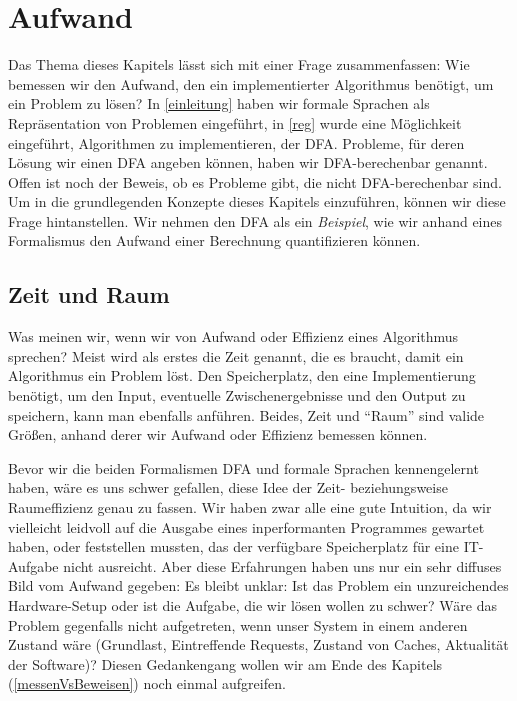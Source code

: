 \chapter{Aufwand}
Das Thema dieses Kapitels lässt sich mit einer Frage zusammenfassen:
Wie bemessen wir den Aufwand,
den ein implementierter Algorithmus benötigt, um ein Problem zu lösen?
In \autoref{einleitung} haben wir formale Sprachen als Repräsentation von Problemen eingeführt,
in \autoref{reg} wurde eine Möglichkeit eingeführt, Algorithmen zu implementieren,
der DFA.
Probleme, für deren Lösung wir einen DFA angeben können, haben wir DFA-berechenbar genannt.
Offen ist noch der Beweis, ob es Probleme gibt, die nicht DFA-berechenbar sind.
Um in die grundlegenden Konzepte dieses Kapitels einzuführen,
können wir diese Frage hintanstellen.
Wir nehmen den DFA als ein \emph{Beispiel},
wie wir anhand eines Formalismus den Aufwand einer Berechnung quantifizieren können.

\section{Zeit und Raum}

Was meinen wir, wenn wir von Aufwand oder Effizienz eines Algorithmus sprechen?
Meist wird als erstes die Zeit genannt,
die es braucht,
damit ein Algorithmus ein Problem löst.
Den Speicherplatz,
den eine Implementierung benötigt,
um den Input,
eventuelle Zwischenergebnisse
und den Output zu speichern,
kann man ebenfalls anführen.
Beides, Zeit und ``Raum'' sind valide Größen,
anhand derer wir Aufwand oder Effizienz bemessen können.

Bevor wir die beiden Formalismen DFA und formale Sprachen kennengelernt haben,
wäre es uns schwer gefallen,
diese Idee der Zeit- beziehungsweise Raumeffizienz genau zu fassen.
Wir haben zwar alle eine gute Intuition,
da wir vielleicht leidvoll auf die Ausgabe eines inperformanten Programmes gewartet haben,
oder feststellen mussten, das der verfügbare Speicherplatz für eine IT-Aufgabe nicht ausreicht.
Aber diese Erfahrungen haben uns nur ein sehr diffuses Bild vom Aufwand gegeben:
Es bleibt unklar:
Ist das Problem ein unzureichendes Hardware-Setup oder ist die Aufgabe,
die wir lösen wollen zu schwer?
Wäre das Problem gegenfalls nicht aufgetreten,
wenn unser System in einem anderen Zustand wäre
(Grundlast, Eintreffende Requests, Zustand von Caches, Aktualität der Software)?
Diesen Gedankengang wollen wir am Ende des Kapitels (\autoref{messenVsBeweisen})
noch einmal aufgreifen.

